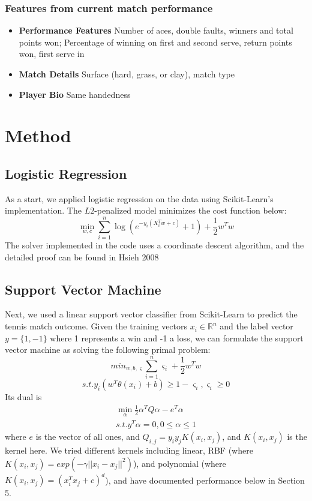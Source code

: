 \documentclass[paper=a4, fontsize=10pt]{scrartcl} %
\numberwithin{equation}{section} %
\numberwithin{figure}{section} %
\numberwithin{table}{section} %
\begin{document}
\subsubsection{Features from current match performance}
\begin{itemize}
\item \textbf{Performance Features} Number of aces, double faults, winners and total points won; Percentage of winning on first and second serve, return points won, first serve in
\item \textbf{Match Details} Surface (hard, grass, or clay), match type
\item \textbf{Player Bio} Same handedness
\end{itemize}

\section{Method}
\subsection{Logistic Regression}
As a start, we applied logistic regression on the data using Scikit-Learn's implementation\cite{scikit-learn}. The $L2$-penalized model minimizes the cost function below: $$\min_{w,c} \sum_{i=1}^n \log(e^{-y_i(X_i^Tw+c)}+1) + \frac{1}{2}w^Tw$$
The solver implemented in the code uses a coordinate descent algorithm, and the detailed proof can be found in Hsieh 2008 \cite{hsieh2008dual}
\subsection{Support Vector Machine}
Next, we used a linear support vector classifier from Scikit-Learn \cite{scikit-learn} to predict the tennis match outcome. Given the training vectors $x_i \in \mathbb{R}^n$ and the label vector $y = \{1,-1\}$ where 1 represents a win and -1 a loss, we can formulate the support vector machine as solving the following primal problem: $$min_{w,b, \varsigma} \sum_{i=1}^n \varsigma_i + \frac{1}{2}w^Tw$$ 
$$s.t. y_i(w^T\theta(x_i) + b) \geq 1 - \varsigma_i,    \varsigma_i \geq 0$$
Its dual is \begin{align*}
\min_\alpha \frac{1}{2}\alpha^TQ\alpha - e^T\alpha \\
s.t. y^T \alpha = 0,  0 \le \alpha \le 1 
\end{align*}
where $e$ is the vector of all ones, and $Q_{i,j} = y_i y_j K(x_i, x_j)$, and $K(x_i, x_j)$ is the kernel here. We tried different kernels including linear, RBF (where $K(x_i, x_j) = exp(-\gamma||x_i - x_j||^2)$), and polynomial (where $K(x_i, x_j) = (x_i^T x_j + c)^d$), and have documented performance below in Section 5.
\end{document}
